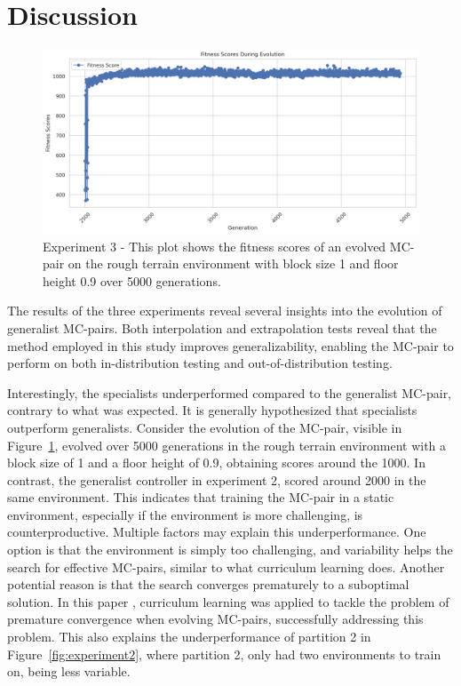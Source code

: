 \section{Discussion}
    \begin{figure}[ht]
        \centering
        \includegraphics[width=\linewidth]{resources/specialist_1_2835/fitness_score_metrics_plot.png}
        \caption{Experiment 3 - This plot shows the fitness scores of an evolved MC-pair on the rough terrain environment with block size 1 and floor height 0.9 over 5000 generations.}
        \label{fig:eval_plot_spec_1}
    \end{figure}

The results of the three experiments reveal several insights into the evolution of generalist MC-pairs. Both interpolation and extrapolation tests reveal that the method employed in this study improves generalizability, enabling the MC-pair to perform on both in-distribution testing and out-of-distribution testing.

Interestingly, the specialists underperformed compared to the generalist MC-pair, contrary to what was expected. It is generally hypothesized that specialists outperform generalists. Consider the evolution of the MC-pair, visible in Figure~\ref{fig:eval_plot_spec_1}, evolved over 5000 generations in the rough terrain environment with a block size of 1 and a floor height of 0.9, obtaining scores around the 1000. In contrast, the generalist controller in experiment 2, scored around 2000 in the same environment. This indicates that training the MC-pair in a static environment, especially if the environment is more challenging, is counterproductive. Multiple factors may explain this underperformance. One option is that the environment is simply too challenging, and variability helps the search for effective MC-pairs, similar to what curriculum learning does. Another potential reason is that the search converges prematurely to a suboptimal solution. In this paper \cite{Emma_Stensby_2021}, curriculum learning was applied to tackle the problem of premature convergence when evolving MC-pairs, successfully addressing this problem. This also explains the underperformance of partition 2 in Figure~\ref{fig:experiment2}, where partition 2, only had two environments to train on, being less variable.

